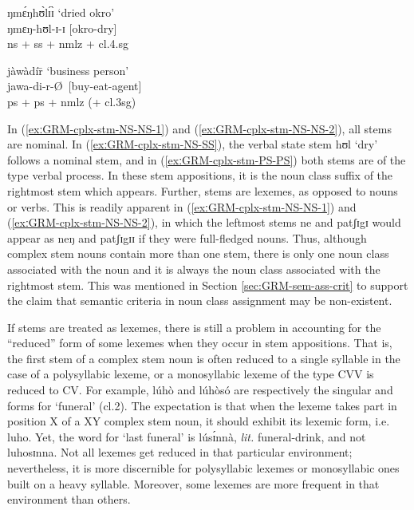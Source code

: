 \begin{exe}
\begin{exe}
\begin{exe}
\begin{exe}
\begin{exe}
\begin{exe}
 \ex\label{exːGRM-cplx-stm-NS-SS}
 {\sls ŋmɛ́ŋhʊ̀lɪ́ɪ̀} {\rm   `dried okro'}\\%
ŋmɛŋ-hʊl-ɪ-ɪ    {\rm [okro-dry]}\\%
 {\sc ns + ss + nmlz +  cl.4.sg}
 
 \ex\label{exːGRM-cplx-stm-PS-PS}
 {\sls jàwàdír̄} {\rm  `business person'}\\%
jawa-di-r-\O \  {\rm [buy-eat-agent]}\\%
 {\sc ps + ps + nmlz (+  cl.3sg)}
 
\z 
 \z


In (\ref{exːGRM-cplx-stm-NS-NS-1}) and (\ref{exːGRM-cplx-stm-NS-NS-2}),  all stems are nominal. In (\ref{exːGRM-cplx-stm-NS-SS}),  the verbal state stem {\sls hʊl} `dry'  follows a nominal stem,  and  in  (\ref{exːGRM-cplx-stm-PS-PS}) both stems are of the type verbal process.  In these stem appositions, it is the noun class suffix of the rightmost stem which appears. Further, stems are lexemes, as opposed to nouns or verbs.  This is readily apparent in  (\ref{exːGRM-cplx-stm-NS-NS-1}) and (\ref{exːGRM-cplx-stm-NS-NS-2}), in which the leftmost stems {\sls ne} and {\sls patʃɪgɪ} would appear as {\sls neŋ} and {\sls patʃɪgɪɪ} if they were full-fledged nouns. Thus, although complex stem nouns contain more than one stem, there is only  one noun class associated with the noun and it is always the noun class associated with the rightmost stem.  This was mentioned in Section \ref{sec:GRM-sem-ass-crit} to support the claim  that semantic criteria in noun class assignment may be  non-existent. 

If  stems are treated as lexemes, there is still a problem in accounting for the ``reduced'' form of  some lexemes when they occur in stem appositions. That is, the first stem  of a complex stem noun is often reduced to a single syllable in the case of a polysyllabic lexeme, or a monosyllabic lexeme of the type CVV is reduced to CV. For example,  {\sls lúhò}  and  {\sls lúhòsó} are respectively the singular and  forms for `funeral' ({\sc cl.2}).  The expectation is that when the lexeme takes part in position X of a XY complex stem noun, it should exhibit its lexemic form, i.e.   {\sls luho}. Yet, the word for `last funeral'  is {\sls lúsɪ́nnà}, {\it lit.} funeral-drink,  and not {\sls *luhosɪnna}.  Not all  lexemes get reduced in that particular environment; nevertheless, it is  more discernible for polysyllabic lexemes or monosyllabic ones built on a heavy syllable. Moreover, some lexemes are more frequent in that environment than others.


\end{exe}
\end{exe}
\end{exe}
\end{exe}
\end{exe}
\end{exe}
